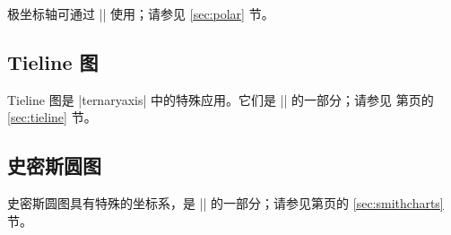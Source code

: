 {极坐标轴可通过 || 使用；请参见
\ref{sec:polar} 节。


\subsection{Tieline 图}

Tieline 图是 |ternaryaxis| 中的特殊应用。它们是
|| 的一部分；请参见
第\pageref{sec:tieline}页的 \ref{sec:tieline} 节。


\subsection{史密斯圆图}

史密斯圆图具有特殊的坐标系，是 ||
的一部分；请参见第\pageref{sec:smithcharts}页的
\ref{sec:smithcharts} 节。

}
